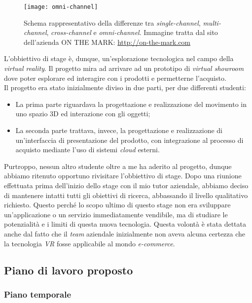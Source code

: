 \label{Omni-channel}
\begin{figure}[ht]
	\begin{center}
		\texttt{[image: omni-channel]}
		\caption{Schema rappresentativo della differenze tra \textit{single-channel}, \textit{multi-channel}, \textit{cross-channel} e \textit{omni-channel}. Immagine tratta dal sito dell'azienda ON THE MARK: \url{http://on-the-mark.com}}
	\end{center}
\end{figure}
\FloatBarrier

L'obbiettivo di stage è, dunque, un'esplorazione tecnologica nel campo della \textit{virtual reality}. Il progetto mira ad arrivare ad un prototipo di \textit{virtual showroom} dove poter esplorare ed interagire con i prodotti e permetterne l'acquisto. \\
Il progetto era stato inizialmente diviso in due parti, per due differenti studenti:
\begin{itemize}
	\item La prima parte riguardava la progettazione e realizzazione del movimento in uno spazio 3D ed interazione con gli oggetti;
	\item La seconda parte trattava, invece, la progettazione e realizzazione di un'interfaccia di presentazione del prodotto, con integrazione al processo di acquisto mediante l'uso di sistemi \textit{cloud} esterni.
\end{itemize}
Purtroppo, nessun altro studente oltre a me ha aderito al progetto, dunque abbiamo ritenuto opportuno rivisitare l'obbiettivo di stage. Dopo una riunione effettuata prima dell'inizio dello stage con il mio tutor aziendale, abbiamo deciso di mantenere intatti tutti gli obiettivi di ricerca, abbassando il livello qualitativo richiesto. Questo perché lo scopo ultimo di questo stage non era sviluppare un'applicazione o un servizio immediatamente vendibile, ma di studiare le potenzialità e i limiti di questa nuova tecnologia. Questa volontà è stata dettata anche dal fatto che il \textit{team} aziendale inizialmente non aveva alcuna certezza che la tecnologia \textit{VR} fosse applicabile al mondo \textit{e-commerce}.

\subsection{Piano di lavoro proposto}

\subsubsection{Piano temporale}

